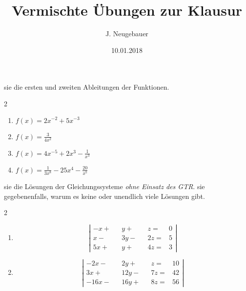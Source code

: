 \documentclass[11pt, a5paper, landscape, final]{scrartcl}
\author{J. Neugebauer}
\title{Vermischte Übungen zur Klausur}
\date{10.01.2018}
\begin{document}
	\begin{aufgabe}
		 sie die ersten und zweiten Ableitungen der Funktionen.
		\begin{multicols}{2}
			\begin{enumerate}[label=\alph*)]
				\item $f(x) = 2x^{-2} + 5x^{-3}$
				\item $f(x) = \frac{3}{4x^2}$
				\item $f(x) = 4x^{-5} + 2x^3 - \frac{1}{x^3}$
				\item $f(x) = \frac{1}{3x^8} - 25x^4 - \frac{20}{x^5}$
			\end{enumerate}
		\end{multicols}
	\end{aufgabe}
	\clearpage
	
	\begin{aufgabe}
		 sie die Lösungen der Gleichungssysteme \emph{ohne Einsatz des GTR}.  sie gegebenenfalls, warum es keine oder unendlich viele Lösungen gibt.
		\begin{multicols}{2}
			\begin{enumerate}[label=\alph*)]
				\item 
				\[ \left| \begin{alignedat}{4}
				-x + && y + && z = & 0 \\
				x - && 3y - && 2z = & 5 \\
				5x + && y + && 4z = & 3
				\end{alignedat} \right| \]
				
				\item 
				\[ \left| \begin{alignedat}{4}
				-2x - && 2y + &&  z = & 10 \\
				3x + && 12y - &&  7z = & 42 \\
				-16x - && 16y + && 8z = & 56
				\end{alignedat} \right| \]
			\end{enumerate}
		\end{multicols}
	\end{aufgabe}
	\clearpage
	
\end{document}
